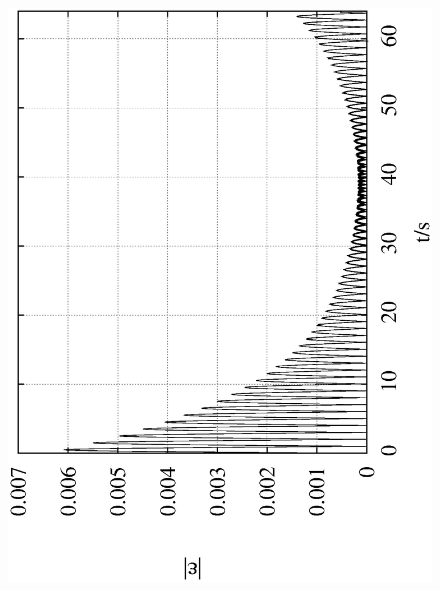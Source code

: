\documentclass[10pt,a4paper]{article}
\begin{document}
\begin{figure}[h!]
\begin{center}
\includegraphics[scale = 0.3, angle =-90]{./Leapfrog_0.01_20000_0.2.eps}

\end{center}
\end{figure}
\end{document}
